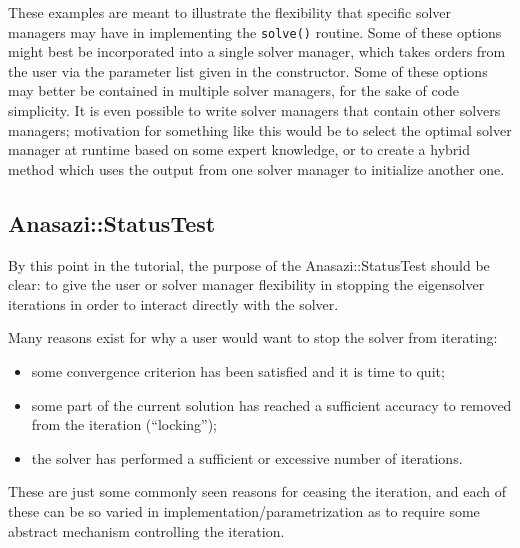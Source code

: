 These examples are meant to illustrate the flexibility that specific solver managers may
have in implementing the \verb!solve()! routine. Some of these options might best be
incorporated into a single solver manager, which takes orders from the user via the
parameter list given in the constructor. Some of these options may better be contained in
multiple solver managers, for the sake of code simplicity. It is even possible to write
solver managers that contain other solvers managers; motivation for something like this
would be to select the optimal solver manager at runtime based on some expert knowledge,
or to create a hybrid method which uses the output from one solver manager to
initialize another one.

\subsection{Anasazi::StatusTest}
\label{sec:anasazi:tester}

By this point in the tutorial, the purpose of the Anasazi::StatusTest should be clear: to
give the user or solver manager flexibility in stopping the eigensolver iterations in
order to interact directly with the solver.

Many reasons exist for why a user would want to stop the solver from iterating:
\begin{itemize}
  \item some convergence criterion has been satisfied and it is time to quit;
  \item some part of the current solution has reached a sufficient accuracy to removed
    from the iteration (``locking'');
  \item the solver has performed a sufficient or excessive number of iterations.
\end{itemize}
These are just some commonly seen reasons for ceasing the iteration, and each of these can
be so varied in implementation/parametrization as to require some abstract mechanism
controlling the iteration.

